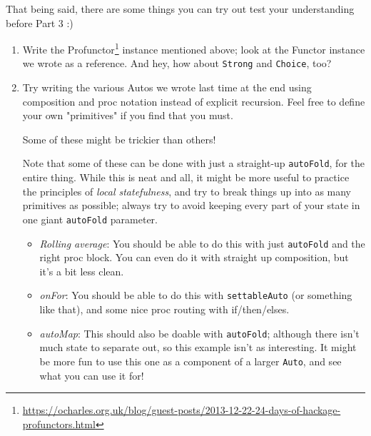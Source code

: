 \documentclass[]{article}
\renewcommand{\href}[2]{#2\footnote{\url{#1}}}
\begin{document}
That being said, there are some things you can try out test your understanding
before Part 3 :)

\begin{enumerate}
\item
  Write the
  \href{https://ocharles.org.uk/blog/guest-posts/2013-12-22-24-days-of-hackage-profunctors.html}{Profunctor}
  instance mentioned above; look at the Functor instance we wrote as a
  reference. And hey, how about \texttt{Strong} and \texttt{Choice}, too?
\item
  Try writing the various Autos we wrote last time at the end using composition
  and proc notation instead of explicit recursion. Feel free to define your own
  "primitives" if you find that you must.

  Some of these might be trickier than others!

  Note that some of these can be done with just a straight-up \texttt{autoFold},
  for the entire thing. While this is neat and all, it might be more useful to
  practice the principles of \emph{local statefulness}, and try to break things
  up into as many primitives as possible; always try to avoid keeping every part
  of your state in one giant \texttt{autoFold} parameter.

  \begin{itemize}
  \item
    \emph{Rolling average}: You should be able to do this with just
    \texttt{autoFold} and the right proc block. You can even do it with straight
    up composition, but it's a bit less clean.
  \item
    \emph{onFor}: You should be able to do this with \texttt{settableAuto} (or
    something like that), and some nice proc routing with if/then/elses.
  \item
    \emph{autoMap}: This should also be doable with \texttt{autoFold}; although
    there isn't much state to separate out, so this example isn't as
    interesting. It might be more fun to use this one as a component of a larger
    \texttt{Auto}, and see what you can use it for!
  \end{itemize}
\end{enumerate}
\end{document}
